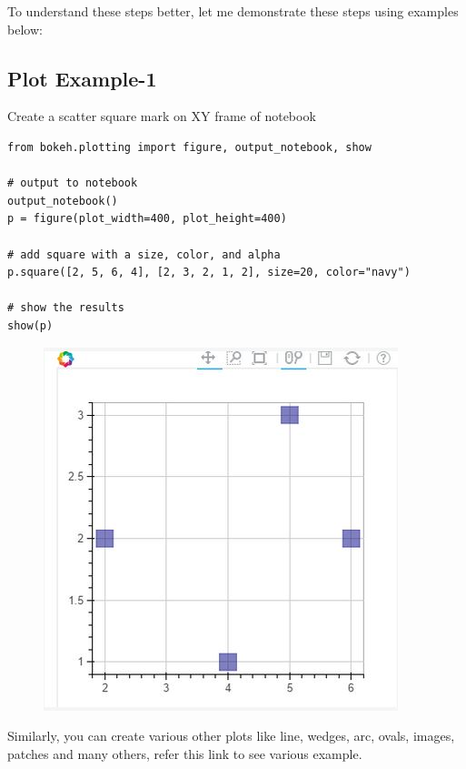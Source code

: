 \documentclass[a4paper,12pt]{article}
\begin{document}
To understand these steps better, let me demonstrate these steps using examples below:


 
\newpage
\subsection{Plot Example-1} 

Create a scatter square mark on XY frame of notebook

\begin{framed}
\begin{verbatim}
from bokeh.plotting import figure, output_notebook, show

# output to notebook
output_notebook()
p = figure(plot_width=400, plot_height=400)

# add square with a size, color, and alpha
p.square([2, 5, 6, 4], [2, 3, 2, 1, 2], size=20, color="navy")

# show the results
show(p)

\end{verbatim}
\end{framed}
\begin{figure}[h!]
\centering
\includegraphics[width=0.7\linewidth]{images/02-plotting-AV-scatterplot}
\caption{}
\label{fig:02-plotting-AV-scatterplot}
\end{figure}

Similarly, you can create various other plots like line, wedges, arc, ovals, images, patches and many others, refer this link to see various example.
\end{document}
